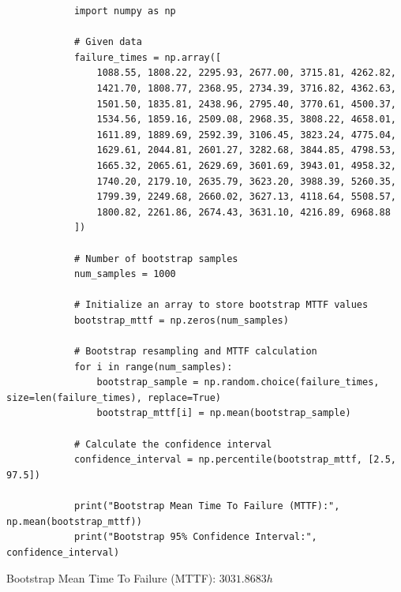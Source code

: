 \documentclass{article}
\begin{document}
\begin{enumerate}[label=(\alph*)]
\begin{flushleft}
        
            \begin{lstlisting}
            import numpy as np
            
            # Given data
            failure_times = np.array([
                1088.55, 1808.22, 2295.93, 2677.00, 3715.81, 4262.82,
                1421.70, 1808.77, 2368.95, 2734.39, 3716.82, 4362.63,
                1501.50, 1835.81, 2438.96, 2795.40, 3770.61, 4500.37,
                1534.56, 1859.16, 2509.08, 2968.35, 3808.22, 4658.01,
                1611.89, 1889.69, 2592.39, 3106.45, 3823.24, 4775.04,
                1629.61, 2044.81, 2601.27, 3282.68, 3844.85, 4798.53,
                1665.32, 2065.61, 2629.69, 3601.69, 3943.01, 4958.32,
                1740.20, 2179.10, 2635.79, 3623.20, 3988.39, 5260.35,
                1799.39, 2249.68, 2660.02, 3627.13, 4118.64, 5508.57,
                1800.82, 2261.86, 2674.43, 3631.10, 4216.89, 6968.88
            ])
            
            # Number of bootstrap samples
            num_samples = 1000
            
            # Initialize an array to store bootstrap MTTF values
            bootstrap_mttf = np.zeros(num_samples)
            
            # Bootstrap resampling and MTTF calculation
            for i in range(num_samples):
                bootstrap_sample = np.random.choice(failure_times, size=len(failure_times), replace=True)
                bootstrap_mttf[i] = np.mean(bootstrap_sample)
            
            # Calculate the confidence interval
            confidence_interval = np.percentile(bootstrap_mttf, [2.5, 97.5])
            
            print("Bootstrap Mean Time To Failure (MTTF):", np.mean(bootstrap_mttf))
            print("Bootstrap 95% Confidence Interval:", confidence_interval)
            \end{lstlisting}
            
            
            Bootstrap Mean Time To Failure (MTTF): $3031.8683h$ \\
        \end{flushleft}


\end{enumerate}
\end{document}
